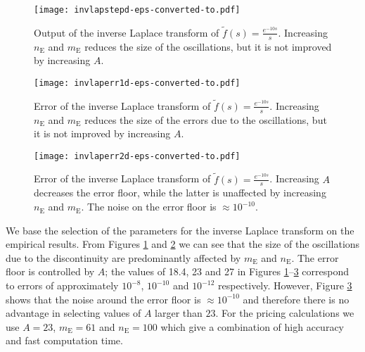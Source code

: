 \documentclass[11pt,a4paper]{article}
\begin{document}
\begin{figure}
\begin{center}
\texttt{[image: invlapstepd-eps-converted-to.pdf]}
\caption{Output of the inverse Laplace transform of $\widetilde{f}(s)=\frac{e^{-10s}}{s}$. Increasing $n_\mathrm{E}$ and $m_\mathrm{E}$ reduces the size of the oscillations, but it is not improved by increasing $A$.}
\label{fig:invlapstep}
\end{center}
\end{figure}
\begin{figure}
\begin{center}
\texttt{[image: invlaperr1d-eps-converted-to.pdf]}
\caption{Error of the inverse Laplace transform of $\widetilde{f}(s)=\frac{e^{-10s}}{s}$. Increasing $n_\mathrm{E}$ and $m_\mathrm{E}$ reduces the size of the errors due to the oscillations, but it is not improved by increasing $A$.}
\label{fig:invlaperr1}
\end{center}
\end{figure}
\begin{figure}
\begin{center}
\texttt{[image: invlaperr2d-eps-converted-to.pdf]}
\caption{Error of the inverse Laplace transform of $\widetilde{f}(s)=\frac{e^{-10s}}{s}$. Increasing $A$ decreases the error floor, while the latter is unaffected by increasing $n_\mathrm{E}$ and $m_\mathrm{E}$. The noise on the error floor is $\approx10^{-10}$.}
\label{fig:invlaperr2}
\end{center}
\end{figure}
We base the selection of the parameters for the inverse Laplace transform on the empirical results. From Figures \ref{fig:invlapstep} and \ref{fig:invlaperr1} we can see that the size of the oscillations due to the discontinuity are predominantly affected by $m_\mathrm{E}$ and $n_\mathrm{E}$. The error floor is controlled by $A$; the values of 18.4, 23 and 27 in Figures \ref{fig:invlapstep}--\ref{fig:invlaperr2} correspond to errors of approximately $10^{-8}$, $10^{-10}$ and $10^{-12}$ respectively. However, Figure \ref{fig:invlaperr2} shows that the noise around the error floor is $\approx10^{-10}$ and therefore there is no advantage in selecting values of $A$ larger than $23$. For the pricing calculations we use $A=23$, $m_\mathrm{E}=61$ and $n_\mathrm{E}=100$ which give a combination of high accuracy and fast computation time.

\end{document}
